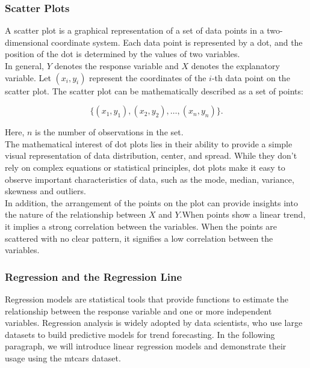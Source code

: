 \documentclass{article}\usepackage[]{graphicx}\usepackage[]{xcolor}
\begin{document}
\subsubsection{Scatter Plots}

A scatter plot is a graphical representation of a set of data points in a two-dimensional coordinate system. Each data point is represented by a dot, and the position of the dot is determined by the values of two variables.\\

\noindent
In general, \(Y\) denotes the response variable and \(X\) denotes the explanatory variable. Let \((x_i, y_i)\) represent the coordinates of the \(i\)-th data point on the scatter plot. The scatter plot can be mathematically described as a set of points:

\[ \{(x_1, y_1), (x_2, y_2), \ldots, (x_n, y_n)\} .\]
  
\noindent
Here, \(n\) is the number of observations in the set.\\

\noindent
The mathematical interest of dot plots lies in their ability to provide a simple visual representation of data distribution, center, and spread. While they don't rely on complex equations or statistical principles, dot plots make it easy to observe important characteristics of data, such as the mode, median, variance, skewness and outliers. \\

\noindent
In addition, the arrangement of the points on the plot can provide insights into the nature of the relationship between \(X\) and \(Y\).When points show a linear trend, it implies a strong correlation between the variables. When the points are scattered with no clear pattern, it signifies a low correlation between the variables.

\subsubsection{Regression and the Regression Line}

Regression models are statistical tools that provide functions to estimate the relationship between the response variable and one or more independent variables. Regression analysis is widely adopted by data scientists, who use large datasets to build predictive models for trend forecasting. In the following paragraph, we will introduce linear regression models and demonstrate their usage using the mtcars dataset.\\
\end{document}

